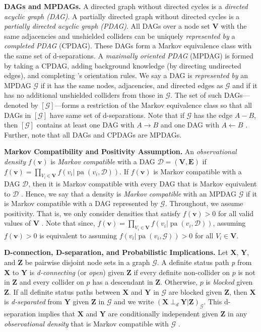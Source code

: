 \documentclass[11pt]{article}
\DeclareMathOperator{\pa}{pa}
\newcommand{\mb}[1]{\mathbf{#1}}
\newcommand{\dsepp}{\perp_{d}}
\newcommand{\g}[1][G]{\mathcal{#1}}
\begin{document}
\textbf{DAGs and MPDAGs.} 
A directed graph without directed cycles is a \textit{directed acyclic graph (DAG)}. A partially directed graph without directed cycles is a \textit{partially directed acyclic graph (PDAG)}. All DAGs over a node set $\mb{V}$ with the same adjacencies and unshielded colliders can be uniquely \textit{represented by} a \textit{completed PDAG} (CPDAG). These DAGs form a Markov equivalence class with the same set of d-separations. A \textit{maximally oriented PDAG} (MPDAG) is formed by taking a CPDAG, adding background knowledge (by directing undirected edges), and completing \cite{meek1995causal}'s orientation rules. We say a DAG is \textit{represented by} an MPDAG $\g$ if it has the same nodes, adjacencies, and directed edges as $\g$ and if it has no additional unshielded colliders from those in $\g$. The set of such DAGs---denoted by $[\g]$---forms a restriction of the Markov equivalence class so that all DAGs in $[\g]$ have same set of d-separations. Note that if $\g$ has the edge $A - B$, then $[\g]$ contains at least one DAG with $A \to B$ and one DAG with $A \gets B$ \citep{meek1995causal}. Further, note that all DAGs and CPDAGs are MPDAGs.

\textbf{Markov Compatibility and Positivity Assumption.}
An \textit{observational density} $f(\mb{v})$ is \textit{Markov compatible} with a DAG $\g[D] = (\mb{V},\mb{E})$ if $f(\mb{v})= \prod_{V_i \in \mb{V}}f(v_i|\pa(v_i,\g[D]))$. If $f(\mb{v})$ is Markov compatible with a DAG $\g[D]$, then it is Markov compatible with every DAG that is Markov equivalent to $\g[D]$ \citep{pearl2009causality}. Hence, we say that a density is \textit{Markov compatible} with an MPDAG $\g$ if it is Markov compatible with a DAG represented by $\g$. Throughout, we assume positivity. That is, we only consider densities that satisfy $f(\mb{v})>0$ for all valid values of $\mb{V}$ \citep{kivva2023identifiability}. Note that since, $f(\mb{v})= \prod_{V_i \in \mb{V}}f(v_i|\pa(v_i,\g[D]))$, assuming   $f(\mb{v})>0$ is equivalent to assuming $f(v_i|\pa(v_i, \g)) > 0$ for all $V_i \in \mb{V}$.

\textbf{D-connection, D-separation, and Probabilistic Implications.}
Let $\mb{X}$, $\mb{Y}$, and $\mb{Z}$ be pairwise disjoint node sets in a graph $\g$. A definite status path \textit{p} from $\mb{X}$ to $\mb{Y}$ is \textit{d-connecting} (or \textit{open}) given $\mb{Z}$ if every definite non-collider on $p$ is not in $\mb{Z}$ and every collider on $p$ has a descendant in $\mb{Z}$. Otherwise, $p$ is \textit{blocked} given $\mb{Z}$. If all definite status paths between $\mb{X}$ and $\mb{Y}$ in $\g$ are blocked given $\mb{Z}$, then $\mb{X}$ is \textit{d-separated} from $\mb{Y}$ given $\mb{Z}$ in $\g$ and we write $(\mb{X} \dsepp \mb{Y} | \mb{Z})_{\g}$. This d-separation implies that $\mb{X}$ and $\mb{Y}$ are conditionally independent given $\mb{Z}$ in any \textit{observational density} that is Markov compatible with $\g$ \citep{lauritzen1990independence, henckel2022graphical}. 
\end{document}
